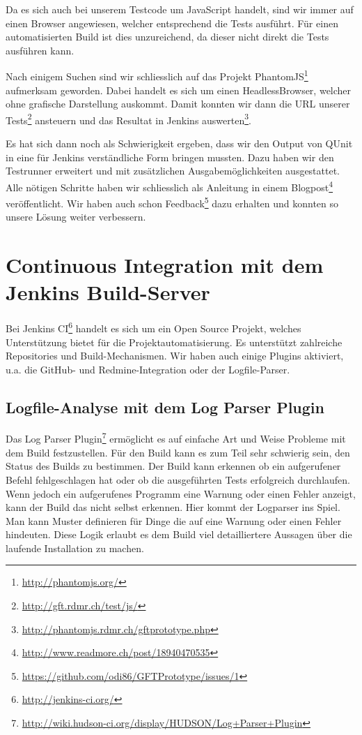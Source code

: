 Da es sich auch bei unserem Testcode um JavaScript handelt, sind wir immer auf einen Browser angewiesen, welcher entsprechend die Tests ausführt. Für einen automatisierten Build ist dies unzureichend, da dieser nicht direkt die Tests ausführen kann.

Nach einigem Suchen sind wir schliesslich auf das Projekt PhantomJS\footnote{\url{http://phantomjs.org/}} aufmerksam geworden. Dabei handelt es sich um einen \gls{HeadlessBrowser}, welcher ohne grafische Darstellung auskommt. Damit konnten wir dann die URL unserer Tests\footnote{\url{http://gft.rdmr.ch/test/js/}} ansteuern und das Resultat in Jenkins auswerten\footnote{\url{http://phantomjs.rdmr.ch/gftprototype.php}}.

Es hat sich dann noch als Schwierigkeit ergeben, dass wir den Output von QUnit in eine für Jenkins verständliche Form bringen mussten. Dazu haben wir den Testrunner  erweitert und mit zusätzlichen Ausgabemöglichkeiten ausgestattet. Alle nötigen Schritte haben wir schliesslich als Anleitung in einem Blogpost\footnote{\url{http://www.readmore.ch/post/18940470535}} veröffentlicht. Wir haben auch schon Feedback\footnote{\url{https://github.com/odi86/GFTPrototype/issues/1}} dazu erhalten und konnten so unsere Lösung weiter verbessern.

\section{Continuous Integration mit dem Jenkins Build-Server}
\label{build-server}
Bei Jenkins CI\footnote{\url{http://jenkins-ci.org/}} handelt es sich um ein Open Source Projekt, welches Unterstützung bietet für die Projektautomatisierung. Es unterstützt zahlreiche Repositories und Build-Mechanismen. Wir haben auch einige Plugins aktiviert, u.a. die GitHub- und Redmine-Integration oder der Logfile-Parser.

\subsection{Logfile-Analyse mit dem Log Parser Plugin}
Das Log Parser Plugin\footnote{\url{http://wiki.hudson-ci.org/display/HUDSON/Log+Parser+Plugin}} ermöglicht es auf einfache Art und Weise Probleme mit dem Build festzustellen. Für den Build kann es zum Teil sehr schwierig sein, den Status des Builds zu bestimmen. Der Build kann erkennen ob ein aufgerufener Befehl fehlgeschlagen hat oder ob die ausgeführten Tests erfolgreich durchlaufen. Wenn jedoch ein aufgerufenes Programm eine Warnung oder einen Fehler anzeigt, kann der Build das nicht selbst erkennen. Hier kommt der Logparser ins Spiel. Man kann Muster definieren für Dinge die auf eine Warnung oder einen Fehler hindeuten. Diese Logik erlaubt es dem Build viel detailliertere Aussagen über die laufende Installation zu machen.

